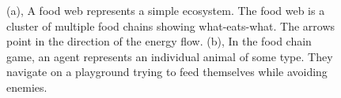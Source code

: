 \documentclass[]{interact}
\theoremstyle{plain}%
\theoremstyle{definition}
\theoremstyle{remark}
\begin{document}
\begin{figure}
\centering
{}
\caption{(a), A food web represents a simple ecosystem. The food web is a cluster of multiple food chains showing what-eats-what. The arrows point in the direction of the energy flow. (b), In the food chain game, an agent represents an individual animal of some type. They navigate on a playground trying to feed themselves while avoiding enemies.}
\label{fig:food_chain_game}
\end{figure}
\end{document}

